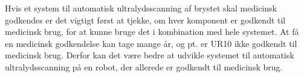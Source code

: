Hvis et system til automatisk ultralydsscanning af brystet skal medicinsk godkendes er det vigtigt først at tjekke, om hver komponent er godkendt til medicinsk brug, for at kunne bruge det i kombination med hele systemet. At få en medicinsk godkendelse kan tage mange år, og pt. er UR10 ikke godkendt til medicinsk brug. Derfor kan det være bedre at udvikle systemet til automatisk ultralydsscanning på en robot, der allerede er godkendt til medicinsk brug. 